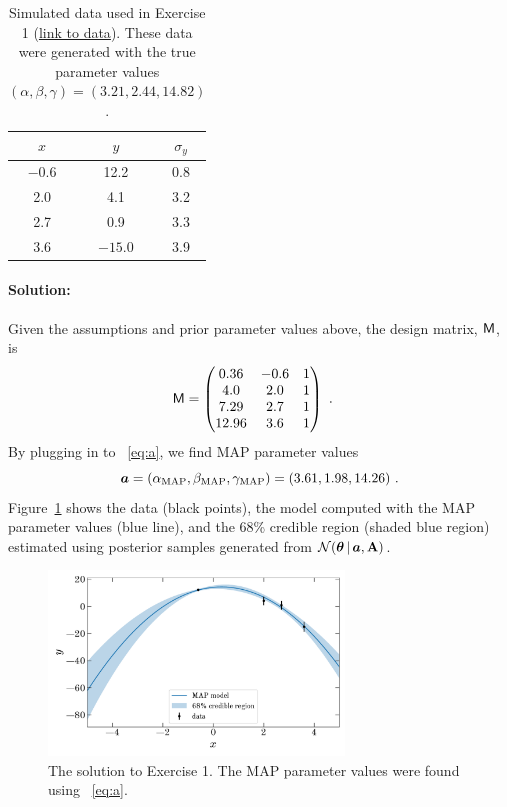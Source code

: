 \begin{table}[t!]
  \footnotesize
  \begin{center}
    \begin{tabular}{c|c|c}
      $x$ & $y$ & $\sigma_y$ \\
      \hline
      $-0.6$ & 12.2 & 0.8 \\
      2.0 & 4.1 & 3.2 \\
      2.7 & 0.9 & 3.3 \\
      3.6 & $-15.0$ & 3.9 \\
    \end{tabular}
    \caption{Simulated data used in Exercise 1
    (\href{https://raw.githubusercontent.com/davidwhogg/GaussianProductRefactor/master/notebooks/data1.csv}{link to data}).
    These data were generated with the true parameter values $(\alpha, \beta, \gamma) = (3.21, 2.44, 14.82)$.
    \label{tbl:data1}}
  \end{center}
\end{table}


\paragraph{Solution:} Given the assumptions and prior parameter values
above, the design matrix, $\mathsf{M}$, is
\begin{align}
  \mathsf{M} &= \begin{pmatrix}
      0.36 & -0.6 & 1\\
      4.0 & 2.0 & 1\\
      7.29 & 2.7 & 1\\
      12.96 & 3.6 & 1
    \end{pmatrix} ~ .
\end{align}
By plugging in to \equationname~\ref{eq:a}, we find MAP parameter values
\begin{equation}
  \boldsymbol{a} =
    (\alpha_{\rm MAP}, \beta_{\rm MAP}, \gamma_{\rm MAP}) =
      (3.61, 1.98, 14.26) ~ .
\end{equation}
Figure~\ref{fig:ex1} shows the data (black points), the model computed with the
MAP parameter values (blue line), and the 68\% credible region (shaded blue
region) estimated using posterior samples generated from
$\mathcal{N}\!\,(\boldsymbol{\theta}\,|\,\boldsymbol{a},\mathbf{A})$.

\begin{figure}[t]
  \centering
  \includegraphics[width=0.7\textwidth]{exercise1.pdf}
  \caption{The solution to Exercise 1. The MAP parameter values were found using
  \equationname~\ref{eq:a}.}
  \label{fig:ex1}
\end{figure}


